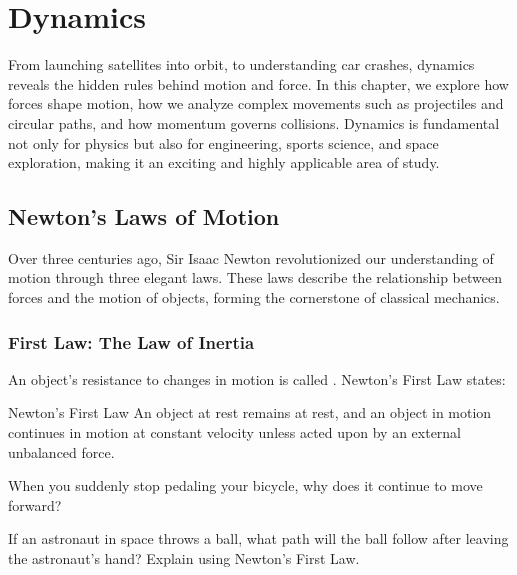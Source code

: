 \chapter{Dynamics}

From launching satellites into orbit, to understanding car crashes, dynamics reveals the hidden rules behind motion and force. In this chapter, we explore how forces shape motion, how we analyze complex movements such as projectiles and circular paths, and how momentum governs collisions. Dynamics is fundamental not only for physics but also for engineering, sports science, and space exploration, making it an exciting and highly applicable area of study.

\section{Newton’s Laws of Motion}
\FloatBarrier

Over three centuries ago, Sir Isaac Newton revolutionized our understanding of motion through three elegant laws. These laws describe the relationship between forces and the motion of objects, forming the cornerstone of classical mechanics.


\subsection{First Law: The Law of Inertia}
\FloatBarrier

An object’s resistance to changes in motion is called . Newton’s First Law states:

\begin{keyconcept}{Newton's First Law}
An object at rest remains at rest, and an object in motion continues in motion at constant velocity unless acted upon by an external unbalanced force.
\end{keyconcept}


\begin{example}
When you suddenly stop pedaling your bicycle, why does it continue to move forward?
\end{example}

\begin{stopandthink}
If an astronaut in space throws a ball, what path will the ball follow after leaving the astronaut's hand? Explain using Newton's First Law.
\end{stopandthink}

